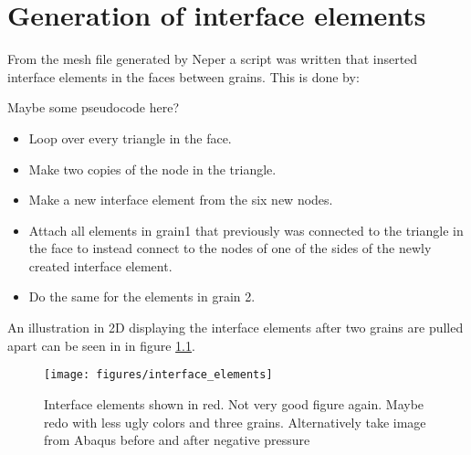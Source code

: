 \documentclass[generate_interface_elements.tex]{subfiles}
\begin{document}
\chapter{Generation of interface elements}

From the mesh file generated by Neper a script was written that inserted interface elements in the faces between grains. This is done by:


Maybe some pseudocode here?
\begin{itemize}
\item  Loop over every triangle in the face.
\item  Make two copies of the node in the triangle.
\item  Make a new interface element from the six new nodes.
\item  Attach all elements in grain1 that previously was connected to the triangle in the face to instead connect to the nodes of one of the sides of the newly created interface element.
\item  Do the same for the elements in grain 2.
\end{itemize}




An illustration in 2D displaying the interface elements after two grains are pulled apart can be seen in in figure \ref{fig:interface_elements}.

\begin{figure}
\centering
\texttt{[image: figures/interface\_elements]}
\caption{Interface elements shown in red. Not very good figure again. Maybe redo with less ugly colors and three grains. Alternatively take image from Abaqus before and after negative pressure}
\label{fig:interface_elements}
\end{figure}

\newpage
\end{document}
